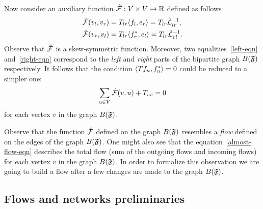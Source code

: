 \documentclass[12pt,oneside,a4paper]{amsart}
\begin{document}
      Now consider an auxiliary function $\mathcal{\hat{F}}: V \times V \to \mathbb{R}$ defined as follows
      \begin{align*}
          &\mathcal{\hat{F}}(v_l, v_r) = T_{lr} \langle f_l, e_r \rangle = T_{lr} \hat{\mathcal{L}}_{lr}^{-1},\\
          &\mathcal{\hat{F}}(v_r, v_l) = T_{lr} \langle f^*_r, e_l \rangle = T_{lr} \hat{\mathcal{L}}_{rl}^{-1}.
      \end{align*}
      Observe that $\mathcal{\hat{F}}$ is a skew-symmetric function.
      Moreover, two equalities~\eqref{left-eqn} and~\eqref{right-eqn} correspond to the \emph{left} and \emph{right}
        parts of the bipartite graph $B(\mathfrak{F})$ respectively.
      It follows that the condition $\langle Tf_n, f_n^* \rangle = 0$ could be reduced to a simpler one:
      \begin{equation}
        \label{almost-flow-eqn}
        \sum_{u \in V} \mathcal{\hat{F}}(v, u) + T_{vv} = 0
      \end{equation}
        for each vertex $v$ in the graph $B(\mathfrak{F})$.
      \begin{remark}
        Observe that the function $\mathcal{\hat{F}}$ defined on the graph $B(\mathfrak{F})$ resembles
          a \emph{flow} defined on the edges of the graph $B(\mathfrak{F})$.
        One might also see that the equation~\eqref{almost-flow-eqn} describes the total flow (sum of the outgoing flows and incoming flows) 
          for each vertex $v$ in the graph $B(\mathfrak{F})$.
        In order to formalize this observation we are going to build a flow
          after a few changes are made to the graph $B(\mathfrak{F})$.
      \end{remark}

    \medskip
    \subsection{Flows and networks preliminaries}
\end{document}
